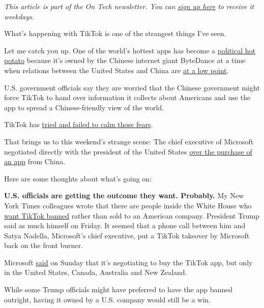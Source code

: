 \emph{This article is part of the On Tech newsletter. You can}
\href{https://www.nytimes3xbfgragh.onion/newsletters/signup/OT}{\emph{sign
up here}} \emph{to receive it weekdays.}

What's happening with TikTok is one of the strangest things I've seen.

Let me catch you up. One of the world's hottest apps has become a
\href{https://www.nytimes3xbfgragh.onion/2020/07/27/technology/tiktok-data-privacy.html}{political
hot potato} because it's owned by the Chinese internet giant ByteDance
at a time when relations between the United States and China are
\href{https://www.nytimes3xbfgragh.onion/2020/07/22/world/asia/us-china-cold-war.html}{at
a low point}.

U.S. government officials say they are worried that the Chinese
government might force TikTok to hand over information it collects about
Americans and use the app to spread a Chinese-friendly view of the
world.

TikTok has
\href{https://www.nytimes3xbfgragh.onion/2020/08/03/technology/tiktok-trump-sale-microsoft.html}{tried
and failed to calm those fears}.

That brings us to this weekend's strange scene: The chief executive of
Microsoft negotiated directly with the president of the United States
\href{https://www.nytimes3xbfgragh.onion/2020/08/01/technology/tiktok-trump-microsoft-bytedance-china-ban.html}{over
the purchase of an app} from China.

Here are some thoughts about what's going on:

\textbf{U.S. officials are getting the outcome they want. Probably.} My
New York Times colleagues wrote that there are people inside the White
House who
\href{https://www.nytimes3xbfgragh.onion/2020/08/02/business/economy/trump-tiktok-china-national-security.html}{want
TikTok banned} rather than sold to an American company. President Trump
said as much himself on Friday. It seemed that a phone call between him
and Satya Nadella, Microsoft's chief executive, put a TikTok takeover by
Microsoft back on the front burner.

Microsoft
\href{https://blogs.microsoft.com/blog/2020/08/02/microsoft-to-continue-discussions-on-potential-tiktok-purchase-in-the-united-states/}{said}
on Sunday that it's negotiating to buy the TikTok app, but only in the
United States, Canada, Australia and New Zealand.

While some Trump officials might have preferred to have the app banned
outright, having it owned by a U.S. company would still be a win.

